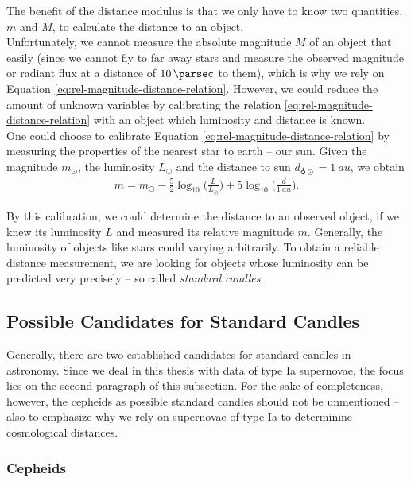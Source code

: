 The benefit of the distance modulus is that we only have to know two quantities, $m$ and $M$, to calculate the distance to an object. \\
Unfortunately, we cannot measure the absolute magnitude $M$ of an object that easily (since we cannot fly to far away stars and measure the observed magnitude or radiant flux at a distance of $\SI{10}{\parsec}$ to them), which is why we rely on Equation \eqref{eq:rel-magnitude-distance-relation}.
However, we could reduce the amount of unknown variables by calibrating the relation \eqref{eq:rel-magnitude-distance-relation} with an object which luminosity and distance is known. \\

\noindent One could choose to calibrate Equation \eqref{eq:rel-magnitude-distance-relation} by measuring the properties of the nearest star to earth -- our sun. Given the magnitude $m_{\odot}$, the luminosity $L_{\odot}$ and the distance to sun $d_{\earth \odot} = \SI{1}{au}$, we obtain 
\begin{align}
    m = m_{\odot} - \frac{5}{2} \log_{10} \biggl(\frac{L}{L_{\odot}}\biggr) + 5 \log_{10} \biggl(\frac{d}{\SI{1}{au}}\biggr). 
\end{align}

\noindent By this calibration, we could determine the distance to an observed object, if we knew its luminosity $L$ and measured its relative magnitude $m$. Generally, the luminosity of objects like stars could varying arbitrarily. To obtain a reliable distance measurement, we are looking for objects whose luminosity can be predicted very precisely -- so called \textit{standard candles}. \\



\subsection{Possible Candidates for Standard Candles} 

Generally, there are two established candidates for standard candles in astronomy. Since we deal in this thesis with data of type Ia supernovae, the focus lies on the second paragraph of this subsection. For the sake of completeness, however, the cepheids as possible standard candles should not be unmentioned -- also to emphasize why we rely on supernovae of type Ia to determinine cosmological distances.

\subsubsection{Cepheids}

